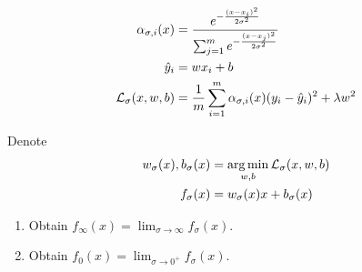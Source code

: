 \begin{align*}
\alpha_{\sigma, i}(x) &= \frac{e^{-\frac{(x - x_i)^2}{2\sigma^2}}}{\sum_{j = 1}^{m} e^{-\frac{(x - x_j)^2}{2\sigma^2}}}\\
\hat{y}_i &= w x_i + b\\
\mathcal{L}_{\sigma}(x, w, b) &= \frac{1}{m}\sum_{i = 1}^{m} \alpha_{\sigma, i}(x)(y_i - \hat{y}_i)^2 + \lambda w^2
\end{align*}

Denote \begin{align*}
w_{\sigma}(x), b_{\sigma}(x) &= \operatorname*{arg\,min}_{w, b}\mathcal{L}_{\sigma}(x, w, b)\\
f_{\sigma}(x) &= w_{\sigma}(x) x + b_{\sigma}(x)
\end{align*}

\begin{enumerate}[label=\alph*)]
\item Obtain $f_{\infty}(x) = \lim_{\sigma \to \infty} f_{\sigma}(x)$.
\item Obtain $f_{0}(x) = \lim_{\sigma \to 0^{+}} f_{\sigma}(x)$.
\end{enumerate}


